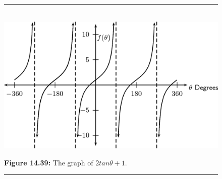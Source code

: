 \setcounter{subfigure}{0}
\begin{figure}[H] %
\begin{center}
\rule[.1in]{\figurerulewidth}{.005in} \\
\label{m39414*uid73!!!underscore!!!media}\label{m39414*uid73!!!underscore!!!printimage}\includegraphics{col11306.imgs/m39414_MG10C15_045.png} %
\vspace{2pt}
\vspace{\rubberspace}\par \begin{cnxcaption}
\small \textbf{Figure 14.39: }The graph of $2tan\theta +1$.
\end{cnxcaption}
\vspace{.1in}
\rule[.1in]{\figurerulewidth}{.005in} \\
\end{center}
\end{figure}       
\label{m39414*secfhsst!!!underscore!!!id3205}
\nopagebreak
